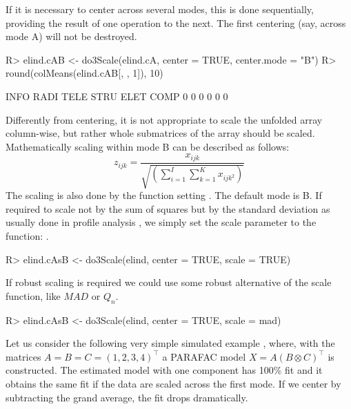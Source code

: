 \documentclass[article,shortnames, nojss]{jss}
\begin{document}
If it is necessary to center across several modes, this is done sequentially,
providing the result of one operation to the next. The first centering
(say,  across  mode A) will not be destroyed.
\begin{Schunk}
\begin{Sinput}
R> elind.cAB <- do3Scale(elind.cA, center = TRUE, center.mode = "B")
R> round(colMeans(elind.cAB[, , 1]), 10)
\end{Sinput}
\begin{Soutput}
INFO RADI TELE STRU ELET COMP 
   0    0    0    0    0    0 
\end{Soutput}
\end{Schunk}
Differently from centering, it is not appropriate to scale the unfolded
array column-wise, but rather whole submatrices of the array should be scaled.
Mathematically scaling within mode B can be described as follows:
\[
 z_{ijk}=\frac{x_{ijk}}{\sqrt{\left( \sum \limits_{i=1}^I \sum \limits_{k=1}^K x_{ijk^2} \right)} }
\]
The scaling is also done by the function  setting .
The default mode is B. If required to scale not by the sum of squares but by the
standard deviation as usually done in profile analysis \citep[see][]{kroonenberg:2009},
we simply set the scale parameter to the function: .
\begin{Schunk}
\begin{Sinput}
R> elind.cAsB <- do3Scale(elind, center = TRUE, scale = TRUE)
\end{Sinput}
\end{Schunk}
If robust scaling is required we could use some robust alternative of the scale function, like $MAD$ or $Q_n$.
\begin{Schunk}
\begin{Sinput}
R> elind.cAsB <- do3Scale(elind, center = TRUE, scale = mad)
\end{Sinput}
\end{Schunk}
Let us consider the following very simple simulated example \citep{bro:1998-2008}, where,
with the matrices $A=B=C= (1, 2, 3, 4 )^\top$ a PARAFAC model $X=A (B \otimes C)^\top$ is constructed.
The estimated model with one component has 100\% fit and it obtains the same fit if the data are
scaled across the first mode. If we center by subtracting the
grand average, the fit drops dramatically.
\end{document}
